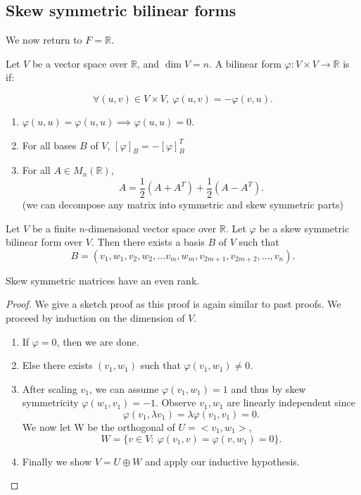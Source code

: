 \documentclass[a4paper]{scrartcl}
\begin{document}
\subsection{Skew symmetric bilinear forms}
We now return to $F=\mathbb{R}$.
\begin{definition}
      Let $V$ be a vector space over $\mathbb{R}$, and $\operatorname{dim}V=n$. A bilinear form $\varphi: V \times V \rightarrow \mathbb{R}$ is  if: 
      
      \[\forall \left(u,v\right) \in V \times V, \ \varphi \left(u,v\right)=-\varphi \left(v,u\right).\]
\end{definition}
\begin{remark}
      \begin{enumerate}
           \item $\varphi \left(u,u\right)=\varphi \left(u,u\right) \implies \varphi \left(u,u\right)=0$.
           \item For all bases $B$ of $V$, $[\varphi]_B=-[\varphi]_B^T$
           \item For all $A \in M_n \left(\mathbb{R}\right)$,
           \[A=\frac{1}{2}\left(A+A^T\right)+ \frac{1}{2}\left(A-A^T\right).\]
           (we can decompose any matrix into symmetric and skew symmetric parts)
      \end{enumerate}
\end{remark}
\begin{theorem}
      Let $V$ be a finite $n$-dimensional vector space over $\mathbb{R}$. Let $\varphi$ be a skew symmetric bilinear form over $V$. Then there exists a basis $B$ of $V$ such that 
      \[B=\left(v_1,w_1,v_2,w_2, \ldots v_m,w_m,v_{2m+1},v_{2m+2},\ldots ,v_n\right).\]
\end{theorem}
\begin{corollary}
     Skew symmetric matrices have an even rank.
\end{corollary}
\begin{proof}
      We give a sketch proof as this proof is again similar to past proofs. We proceed by induction on the dimension of $V$.
      \begin{enumerate}
           \item If $\varphi=0$, then we are done.
           \item Else there exists $\left(v_1,w_1\right)$ such that $\varphi \left(v_1,w_1\right)\neq 0$.
           \item After scaling $v_1$, we can assume $\varphi \left(v_1,w_1\right)=1$ and thus by skew symmetricity $\varphi \left(w_1,v_1\right)=-1$. Observe $v_1,w_1$ are linearly independent since 
           \[\varphi \left(v_1, \lambda v_1\right)=\lambda \varphi \left(v_1,v_1\right)=0.\]
           We now let W be the orthogonal of $U=<v_1,w_1>$, 
           \[ W=\{v \in V: \ \varphi \left(v_1,v\right)=\varphi \left(v,w_1\right)=0 \}. \]
           \item Finally we show $V=U \oplus W$ and apply our inductive hypothesis.
      \end{enumerate}
\end{proof}
\end{document}
